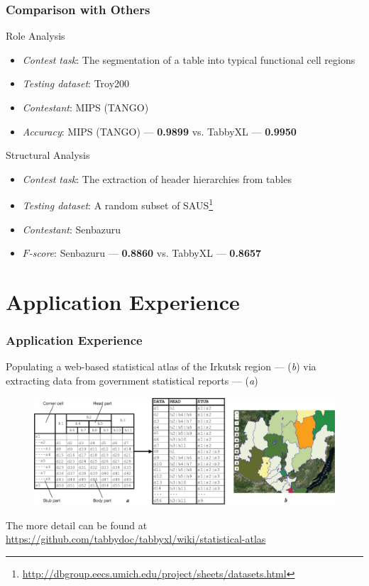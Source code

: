 \documentclass[10pt]{beamer}
\begin{document}
\begin{frame}
\frametitle{Comparison with Others}

\small{
\begin{block}{Role Analysis}
\begin{itemize}
\item \emph{Contest task}: The segmentation of a table into typical functional cell regions
\item \emph{Testing dataset}: Troy200  \cite{Nagy2016}
\item \emph{Contestant}: MIPS (TANGO) \cite{Embley2016}
\item \emph{Accuracy}: MIPS (TANGO) --- \textbf{0.9899} vs. TabbyXL --- \textbf{0.9950}
\end{itemize}
\end{block}

\begin{block}{Structural Analysis}
\begin{itemize}
	\item \emph{Contest task}: The extraction of header hierarchies from tables
	\item \emph{Testing dataset}: A random subset of SAUS\footnote{\url{http://dbgroup.eecs.umich.edu/project/sheets/datasets.html}}
	\item \emph{Contestant}: Senbazuru \cite{Chen2014}
	\item $F$\emph{-score}: Senbazuru --- \textbf{0.8860} vs. TabbyXL --- \textbf{0.8657}
\end{itemize}
\end{block}
}
\end{frame}

\section{Application Experience}

\begin{frame}
\frametitle{Application Experience}
Populating a web-based statistical atlas of the Irkutsk region --- (\textit{b}) via extracting data from government statistical reports --- (\textit{a})
\begin{figure}
\includegraphics[width=1\linewidth]{application1}
\end{figure}
\tiny{The more detail can be found at \url{https://github.com/tabbydoc/tabbyxl/wiki/statistical-atlas}}
\end{frame}
\end{document}
